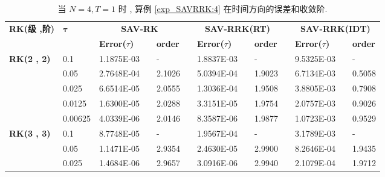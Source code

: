 \begin{table}[H]\scriptsize
\centering
\caption{当 $N=4 , T = 1$ 时 , 算例 \ref{exp_SAVRRK:4}  在时间方向的误差和收敛阶.}
\begin{tabular}{lllllrlrlrlrlrl}
\toprule
\multicolumn{2}{l}{\multirow{2}[3]{*}{\textbf{RK(级 ,阶)}}} & \multicolumn{2}{l}{\multirow{2}[3]{*}{$\bm{\tau}$}} & \multicolumn{3}{c}{\textbf{SAV-RK}} &       & \multicolumn{3}{c}{\textbf{SAV-RRK(RT)}} &       & \multicolumn{3}{c}{\textbf{SAV-RRK(IDT)}} \\
\cmidrule{5-7}\cmidrule{9-11}\cmidrule{13-15}    \multicolumn{2}{l}{} & \multicolumn{2}{l}{} & \textbf{Error($\tau$)} &       & \textbf{order} &       & \textbf{Error($\tau$)} &       & \textbf{order} &       & \textbf{Error($\tau$)} &       & \textbf{order} \\
\hline
\multicolumn{2}{l}{\multirow{5}[0]{*}{\textbf{RK(2 , 2)}}} & \multicolumn{2}{l}{0.1} & 1.1875E-03 &       &-    &       & 1.8837E-03 &       &-    &       & 9.5325E-03 &       &-\\
\multicolumn{2}{l}{} & \multicolumn{2}{l}{0.05} & 2.7648E-04 &       & 2.1026  &       & 5.0394E-04 &       & 1.9023  &       & 6.7134E-03 &       & 0.5058  \\
\multicolumn{2}{l}{} & \multicolumn{2}{l}{0.025} & 6.6514E-05 &       & 2.0555  &       & 1.3036E-04 &       & 1.9508  &       & 3.8805E-03 &       & 0.7908  \\
\multicolumn{2}{l}{} & \multicolumn{2}{l}{0.0125} & 1.6300E-05 &       & 2.0288  &       & 3.3151E-05 &       & 1.9754  &       & 2.0757E-03 &       & 0.9026  \\
\multicolumn{2}{l}{} & \multicolumn{2}{l}{0.00625} & 4.0339E-06 &       & 2.0146  &       & 8.3587E-06 &       & 1.9877  &       & 1.0723E-03 &       & 0.9529  \\
\multicolumn{2}{l}{\multirow{5}[0]{*}{\textbf{RK(3 , 3)}}} & \multicolumn{2}{l}{0.1} & 8.7748E-05 &       &-    &       & 1.9567E-04 &       &-    &       & 3.1789E-03 &       &-\\
\multicolumn{2}{l}{} & \multicolumn{2}{l}{0.05} & 1.1471E-05 &       & 2.9354  &       & 2.4630E-05 &       & 2.9900  &       & 8.2646E-04 &       & 1.9435  \\
\multicolumn{2}{l}{} & \multicolumn{2}{l}{0.025} & 1.4684E-06 &       & 2.9657  &       & 3.0916E-06 &       & 2.9940  &       & 2.1079E-04 &       & 1.9712  \\

\end{tabular}
\end{table}
